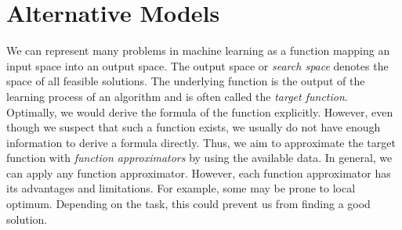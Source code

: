 
\section{Alternative Models}
\label{sec:models}
We can represent many problems in machine learning as a function mapping an input space into an output space. The output space or \textit{search space} denotes the space of all feasible solutions. The underlying function is the output of the learning process of an algorithm and is often called the \textit{target function}. Optimally, we would derive the formula of the function explicitly. However, even though we suspect that such a function exists, we usually do not have enough information to derive a formula directly. Thus, we aim to approximate the target function with \textit{function approximators} by using the available data. In general, we can apply any function approximator. However, each function approximator has its advantages and limitations. For example, some may be prone to local optimum. Depending on the task, this could prevent us from finding a good solution.
